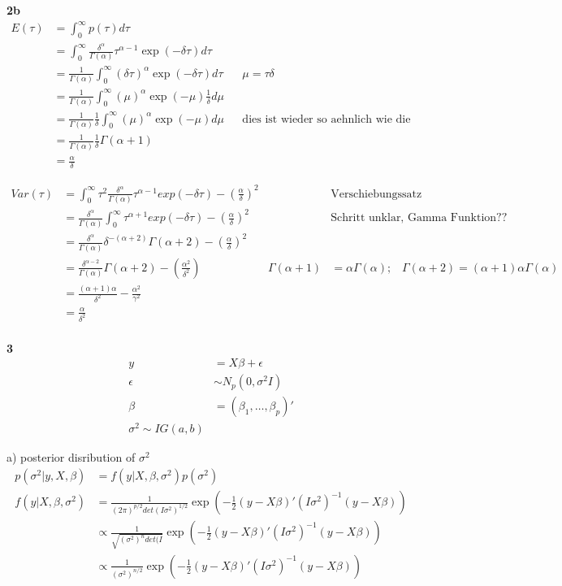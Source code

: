 \documentclass{article}
\begin{document}
\textbf{2b}\\
\begin{align*}
E(\tau) &= \int_0^\infty p(\tau) d \tau \\
&= \int_0^\infty \frac{\delta^{\alpha}}{\Gamma(\alpha)} \tau^{\alpha-1} \exp(- \delta \tau) d \tau \\
&= \frac{1}{\Gamma(\alpha)} \int_0^\infty (\delta \tau)^{\alpha} \exp(- \delta \tau) d \tau && \mu=\tau \delta\\
&= \frac{1}{\Gamma(\alpha)} \int_0^\infty (\mu)^{\alpha} \exp(- \mu) \frac{1}{\delta} d \mu \\        
&= \frac{1}{\Gamma(\alpha)} \frac{1}{\delta} \int_0^\infty (\mu)^{\alpha} \exp(- \mu) d \mu && \text{dies ist wieder so aehnlich wie die Gamma Funktion (fehlt ein -)}\\
&= \frac{1}{\Gamma(\alpha)} \frac{1}{\delta} \Gamma(\alpha+1)\\
&= \frac{\alpha}{\delta}
\end{align*}

\begin{align*}
Var(\tau)&= \int_0^\infty \tau^2 \frac{\delta^\alpha}{\Gamma(\alpha)} \tau^{\alpha-1} exp(-\delta \tau) - (\frac{\alpha}{\delta})^2 && \text{Verschiebungssatz} \\
&= \frac{\delta^\alpha}{\Gamma(\alpha)} \int_0^\infty \tau^{\alpha+1} exp(-\delta \tau) - (\frac{\alpha}{\delta})^2 && \text{Schritt unklar, Gamma Funktion??}\\
&= \frac{\delta^\alpha}{\Gamma(\alpha)} \delta^{-(\alpha+2)}\Gamma(\alpha+2)-(\frac{\alpha}{\delta})^2\\
&= \frac{\delta^{\alpha-2}}{\Gamma(\alpha)} \Gamma(\alpha+2)-(\frac{\alpha^2}{\delta^2}) & \Gamma(\alpha+1) &= \alpha \Gamma(\alpha)\text{;} \quad \Gamma(\alpha+2) = (\alpha+1)\alpha \Gamma(\alpha)\\
&=\frac{(\alpha+1)\alpha}{\delta^2}-\frac{\alpha^2}{\gamma^2}\\
&=\frac{\alpha}{\delta^2}\\
\end{align*}

\textbf{3}
\begin{align*}
y &= X\beta + \epsilon \\
\epsilon &\sim N_p(0, \sigma^2 I) \\
\beta &= (\beta_1, \hdots, \beta_p)' \\
\sigma^2 \sim IG(a,b)
\end{align*}

a) posterior disribution of $\sigma^2$
\begin{align*}
p(\sigma^2 | y,X,\beta) &= f(y|X, \beta, \sigma^2) p(\sigma^2) \\ 
f(y|X, \beta, \sigma^2) &= \frac{1}{(2 \pi)^{p/2} det(I \sigma^2)^{1/2}} 
\exp(-\frac{1}{2}(y-X\beta)' (I \sigma^2)^{-1} (y-X\beta))  \\
&\propto \frac{1}{ \sqrt{ (\sigma^2)^n det(I }} 
\exp(-\frac{1}{2}(y-X\beta)' (I \sigma^2)^{-1} (y-X\beta))  \\
&\propto \frac{1}{ (\sigma^2)^{n/2} } 
\exp(-\frac{1}{2}(y-X\beta)' (I \sigma^2)^{-1} (y-X\beta))  
\end{align*}
\end{document}

